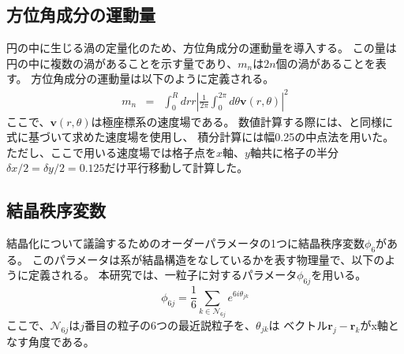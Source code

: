 \documentclass[/Users/ikedahajime/GitHub/reserch/master_report/thesis]{subfiles}
\begin{document}
\subsection{方位角成分の運動量}
円の中に生じる渦の定量化のため、方位角成分の運動量を導入する\cite{nishiguchiVortexReversalPrecursor2024}。
この量は円の中に複数の渦があることを示す量であり、$m_n$は$2n$個の渦があることを表す。
方位角成分の運動量は以下のように定義される。
\begin{eqnarray}
    m_n &=& \int_0^R dr r\left|\frac{1}{2\pi}\int_0^{2\pi}d\theta \bm{v}(r,\theta)\right|^2
\end{eqnarray}
ここで、$\bm{v}(r,\theta)$は極座標系の速度場である。
数値計算する際には、と同様に式に基づいて求めた速度場を使用し、
積分計算には幅0.25の中点法を用いた。
ただし、ここで用いる速度場では格子点を$x$軸、$y$軸共に格子の半分$\delta x/2=\delta y/2=0.125$だけ平行移動して計算した。

\subsection{結晶秩序変数}
結晶化について議論するためのオーダーパラメータの1つに結晶秩序変数$\phi_6$がある。
このパラメータは系が結晶構造をなしているかを表す物理量で、以下のように定義される。
本研究では、一粒子に対するパラメータ$\phi_{6j}$を用いる。
\begin{equation}
    \phi_{6j}=\frac{1}{6}\sum_{k\in \mathcal{N}_{6j}} e^{6i\theta_{jk}}
\end{equation}
ここで、$\mathcal{N}_{6j}$は$j$番目の粒子の6つの最近説粒子を、$\theta_{jk}$は
ベクトル$\bm{r}_j-\bm{r}_k$がx軸となす角度である。
\end{document}
